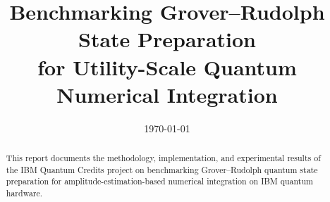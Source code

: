 \documentclass[11pt,a4paper]{article}
\title{\bf Benchmarking Grover--Rudolph State Preparation\\
for Utility-Scale Quantum Numerical Integration}
\author{}
\date{\today}
\begin{document}
\maketitle

\begin{abstract}
This report documents the methodology, implementation, and experimental results
of the IBM Quantum Credits project on benchmarking Grover--Rudolph quantum state
preparation for amplitude-estimation-based numerical integration on IBM quantum
hardware.
\end{abstract}

\tableofcontents










\end{document}
